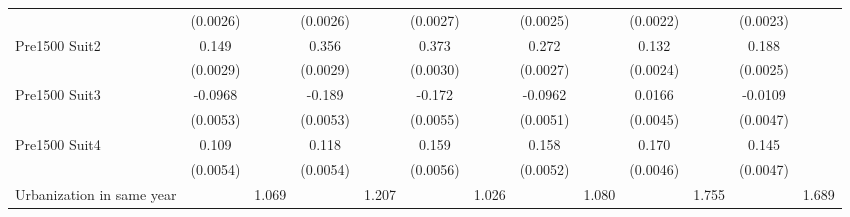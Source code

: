 {\begin{tabular}{l*{12}{c}}
                    &    (0.0026)         &                     &    (0.0026)         &                     &    (0.0027)         &                     &    (0.0025)         &                     &    (0.0022)         &                     &    (0.0023)         &                     \\
\addlinespace
Pre1500 Suit2       &       0.149\sym{***}&                     &       0.356\sym{***}&                     &       0.373\sym{***}&                     &       0.272\sym{***}&                     &       0.132\sym{***}&                     &       0.188\sym{***}&                     \\
                    &    (0.0029)         &                     &    (0.0029)         &                     &    (0.0030)         &                     &    (0.0027)         &                     &    (0.0024)         &                     &    (0.0025)         &                     \\
\addlinespace
Pre1500 Suit3       &     -0.0968\sym{***}&                     &      -0.189\sym{***}&                     &      -0.172\sym{***}&                     &     -0.0962\sym{***}&                     &      0.0166\sym{***}&                     &     -0.0109\sym{*}  &                     \\
                    &    (0.0053)         &                     &    (0.0053)         &                     &    (0.0055)         &                     &    (0.0051)         &                     &    (0.0045)         &                     &    (0.0047)         &                     \\
\addlinespace
Pre1500 Suit4       &       0.109\sym{***}&                     &       0.118\sym{***}&                     &       0.159\sym{***}&                     &       0.158\sym{***}&                     &       0.170\sym{***}&                     &       0.145\sym{***}&                     \\
                    &    (0.0054)         &                     &    (0.0054)         &                     &    (0.0056)         &                     &    (0.0052)         &                     &    (0.0046)         &                     &    (0.0047)         &                     \\
\addlinespace
Urbanization in same year&                     &       1.069\sym{***}&                     &       1.207\sym{***}&                     &       1.026\sym{***}&                     &       1.080\sym{***}&                     &       1.755\sym{***}&                     &       1.689\sym{***}\\

\end{tabular}}
